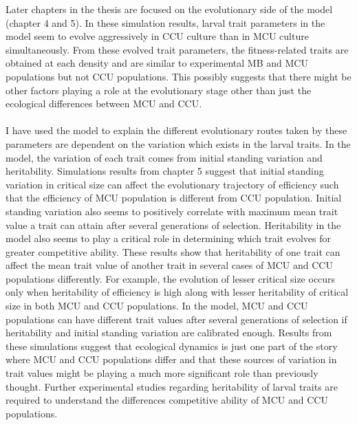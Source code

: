 Later chapters in the thesis are focused on the evolutionary side of the model (chapter 4 and 5). In these simulation results, larval trait parameters in the model seem to evolve aggressively in CCU culture than in MCU culture simultaneously. From these evolved trait parameters, the fitness-related traits are obtained at each density and are similar to experimental MB and MCU populations but not CCU populations. This possibly suggests that there might be other factors playing a role at the evolutionary stage other than just the ecological differences between MCU and CCU. \\\\
I have used the model to explain the different evolutionary routes taken by these parameters are dependent on the variation which exists in the larval traits. In the model, the variation of each trait comes from initial standing variation and heritability. Simulations results from chapter 5 suggest that initial standing variation in critical size can affect the evolutionary trajectory of efficiency such that the efficiency of MCU population is different from CCU population. Initial standing variation also seems to positively correlate with maximum mean trait value a trait can attain after several generations of selection. Heritability in the model also seems to play a critical role in determining which trait evolves for greater competitive ability. These results show that heritability of one trait can affect the mean trait value of another trait in several cases of MCU and CCU populations differently. For example, the evolution of lesser critical size occurs only when heritability of efficiency is high along with lesser heritability of critical size in both MCU and CCU populations. In the model, MCU and CCU populations can have different trait values after several generations of selection if heritability and initial standing variation are calibrated enough. Results from these simulations suggest that ecological dynamics is just one part of the story where MCU and CCU populations differ and that these sources of variation in trait values might be playing a much more significant role than previously thought. Further experimental studies regarding heritability of larval traits are required to understand the differences competitive ability of MCU and CCU populations.\\\\
